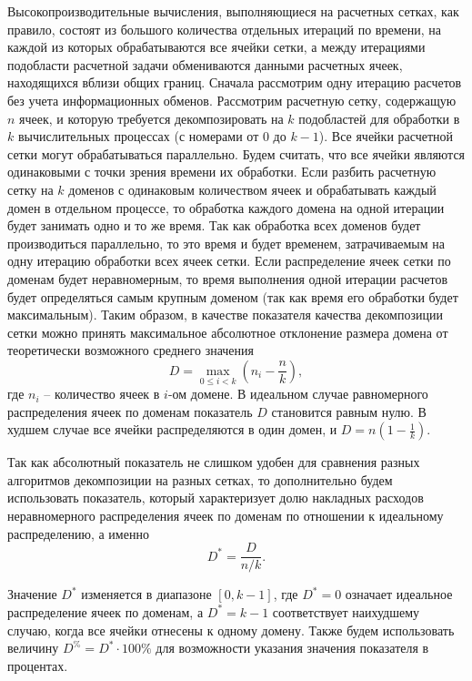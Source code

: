 Высокопроизводительные вычисления, выполняющиеся на расчетных сетках, как правило, состоят из большого количества отдельных итераций по времени, на каждой из которых обрабатываются все ячейки сетки, а между итерациями подобласти расчетной задачи обмениваются данными расчетных ячеек, находящихся вблизи общих границ.
Сначала рассмотрим одну итерацию расчетов без учета информационных обменов.
Рассмотрим расчетную сетку, содержащую $n$ ячеек, и которую требуется декомпозировать на $k$ подобластей для обработки в $k$ вычислительных процессах (с номерами от $0$ до $k - 1$).
Все ячейки расчетной сетки могут обрабатываться параллельно.
Будем считать, что все ячейки являются одинаковыми с точки зрения времени их обработки.
Если разбить расчетную сетку на $k$ доменов с одинаковым количеством ячеек и обрабатывать каждый домен в отдельном процессе, то обработка каждого домена на одной итерации будет занимать одно и то же время.
Так как обработка всех доменов будет производиться параллельно, то это время и будет временем, затрачиваемым на одну итерацию обработки всех ячеек сетки.
Если распределение ячеек сетки по доменам будет неравномерным, то время выполнения одной итерации расчетов будет определяться самым крупным доменом (так как время его обработки будет максимальным).
Таким образом, в качестве показателя качества декомпозиции сетки можно принять максимальное абсолютное отклонение размера домена от теоретически возможного среднего значения
\begin{equation}
	D = \max_{0 \le i < k}{ \left( n_i - \frac{n}{k} \right) },
\end{equation}
где $n_i$ – количество ячеек в $i$-ом домене.
В идеальном случае равномерного распределения ячеек по доменам показатель $D$ становится равным нулю.
В худшем случае все ячейки распределяются в один домен, и $D = n \left( 1 - \frac{1}{k} \right)$.

Так как абсолютный показатель не слишком удобен для сравнения разных алгоритмов декомпозиции на разных сетках, то дополнительно будем использовать показатель, который характеризует долю накладных расходов неравномерного распределения ячеек по доменам по отношении к идеальному распределению, а именно
\begin{equation}
	D^{*} = \frac{D}{n / k}.
\end{equation}

Значение $D^{*}$ изменяется в диапазоне $[0, k - 1]$, где $D^{*} = 0$ означает идеальное распределение ячеек по доменам, а $D^{*} = k - 1$ соответствует наихудшему случаю, когда все ячейки отнесены к одному домену.
Также будем использовать величину $D^{\%} = D^{*} \cdot 100\%$ для возможности указания значения показателя в процентах.

